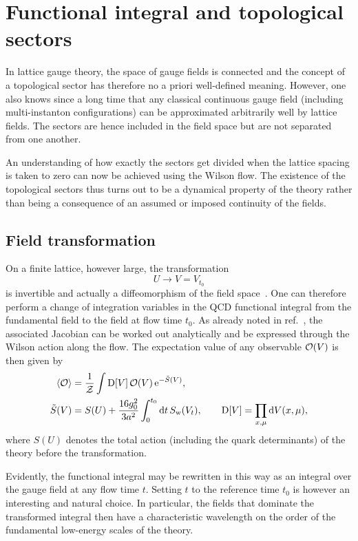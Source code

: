 \section{Functional integral and topological sectors}

In lattice gauge theory, the space of gauge fields is connected
and the concept of a topological sector has therefore no
a priori well-defined meaning.
However, one also knows since a long time that any classical
continuous gauge field (including multi-instanton configurations) can
be approximated arbitrarily well by lattice fields.
The sectors are hence included in the field space
but are not separated
from one another.

An understanding of
how exactly the sectors
get divided when the lattice spacing is taken to zero
can now be achieved using the Wilson flow.
The existence of the topological sectors thus
turns out to be a dynamical property of the theory rather than
being a consequence of an assumed or imposed continuity
of the fields.


\subsection{Field transformation}

On a finite lattice, however large, the transformation
\begin{equation}
  U\to V=V_{t_0}
  \label{eq:fieldtrafo}
\end{equation}
is invertible and actually a diffeomorphism of the field space~\cite{TrivMaps}.
One can therefore perform a change of integration
variables in the QCD functional integral from the fundamental field
to the field at flow time $t_0$.
As already noted in ref.~\cite{TrivMaps},
the associated Jacobian can be worked out analytically and be
expressed through the Wilson action along the flow.
The expectation value of any observable $\mathcal{O}(V)$ is then
given by
\begin{align}
  \langle\mathcal{O}\rangle&={1\over{\cal Z}}\int
  \mathrm{D}[V]\,\mathcal{O}(V)\,\mathrm{e}^{-\tilde{S}(V)},
  \label{eq:fint}\\
  \tilde{S}(V)&=S(U)+{16g_0^2\over3a^2}\int_0^{t_0}\mathrm{d} t\,S_{\mathrm{w}}(V_t),
  \qquad
  \mathrm{D}[V]=\prod_{x,\mu}\mathrm{d} V(x,\mu),
  \label{eq:tSaction}
\end{align}
where $S(U)$ denotes the total action
(including the quark determinants)
of the theory before the transformation.

Evidently, the functional integral may be rewritten in this way
as an integral over the gauge field at any flow time $t$.
Setting $t$ to the reference time $t_0$ is however an
interesting and natural choice.
In particular, the fields that dominate
the transformed integral then have a characteristic
wavelength on the order of the fundamental
low-energy scales of the theory.


